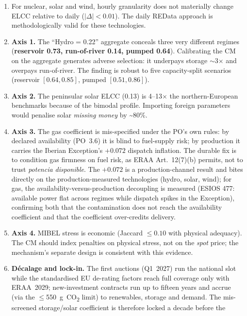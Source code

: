 \documentclass[11pt,a4paper]{article}
\begin{document}
\begin{enumerate}
\item For nuclear, solar and wind, hourly granularity does not materially change
      ELCC relative to daily ($|\Delta| < 0.01$). The daily REData approach is
      methodologically valid for these technologies.
\item \textbf{Axis 1.} The ``Hydro = 0.22'' aggregate conceals three very different
      regimes (\textbf{reservoir 0.73, run-of-river 0.14, pumped 0.64}). Calibrating
      the CM on the aggregate generates adverse selection: it underpays storage
      $\sim$3$\times$ and overpays run-of-river. The finding is robust to five
      capacity-split scenarios (reservoir $[0.64,0.85]$, pumped $[0.51,0.86]$).
\item \textbf{Axis 2.} The peninsular solar ELCC (0.13) is 4--13$\times$ the
      northern-European benchmarks because of the bimodal profile. Importing foreign
      parameters would penalise solar \emph{missing money} by \textasciitilde80\%.
\item \textbf{Axis 3.} The gas coefficient is mis-specified under the PO's own rules:
      by declared availability (PO~3.6) it is blind to fuel-supply risk; by production
      it carries the Iberian Exception's $+0.072$ dispatch inflation. The durable fix
      is to condition gas firmness on fuel risk, as ERAA Art.~12(7)(b) permits, not to
      trust \emph{potencia disponible}. The $+0.072$ is a production-channel result and
      bites directly on the production-measured technologies (hydro, solar, wind); for
      gas, the availability-versus-production decoupling is measured (ESIOS 477:
      available power flat across regimes while dispatch spikes in the Exception),
      confirming both that the contamination does not reach the availability coefficient
      and that the coefficient over-credits delivery.
\item \textbf{Axis 4.} MIBEL stress is economic (Jaccard $\leq 0.10$ with physical
      adequacy). The CM should index penalties on physical stress, not on the
      \emph{spot} price; the mechanism's separate design is consistent with this
      evidence.
\item \textbf{Décalage and lock-in.} The first auctions (Q1~2027) run the national
      slot while the standardised EU de-rating factors reach full coverage only with
      ERAA~2029; new-investment contracts run up to fifteen years and accrue (via the
      $\le$550~g~CO\textsubscript{2} limit) to renewables, storage and demand. The
      mis-screened storage/solar coefficient is therefore locked a decade before the

\end{enumerate}
\end{document}
